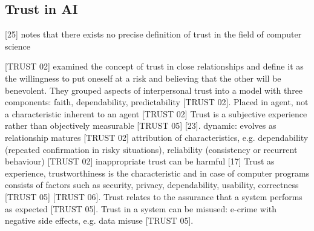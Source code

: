 \subsection{Trust in AI}
[25] notes that there exists no precise definition of trust in the field of computer science\newline

[TRUST 02] examined the concept of trust in close relationships and define it as the willingness to put oneself at a risk and believing that the other will be benevolent. They grouped aspects of interpersonal trust into a model with three components: faith, dependability, predictability [TRUST 02]. \newline
Placed in agent, not a characteristic inherent to an agent [TRUST 02]\newline
Trust is a subjective experience rather than objectively measurable [TRUST 05] [23]. \newline
dynamic: evolves as relationship matures [TRUST 02]\newline
attribution of characteristics, e.g. dependability (repeated confirmation in risky situations), reliability (consistency or recurrent behaviour) [TRUST 02]\newline
inappropriate trust can be harmful [17]\newline
Trust as experience, trustworthiness is the characteristic and in case of computer programs consists of factors such as security, privacy, dependability, usability, correctness [TRUST 05] [TRUST 06]. Trust relates to the assurance that a system performs as expected [TRUST 05]. \newline
Trust in a system can be misused: e-crime with negative side effects, e.g. data misuse [TRUST 05]. \newline 


